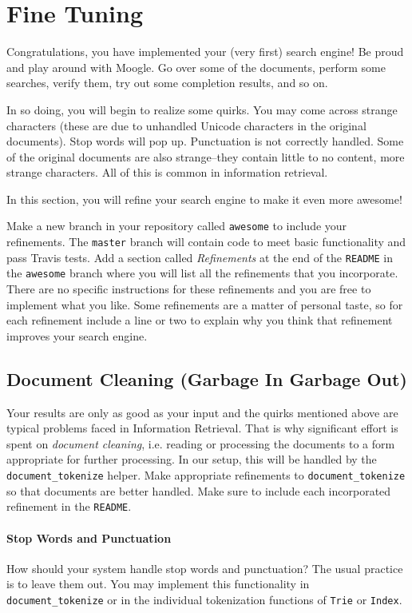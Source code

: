\documentclass[addpoints]{exam}
\begin{document}
\section{Fine Tuning}
\label{sec:refine}

Congratulations, you have implemented your (very first) search engine! Be proud and play around with Moogle. Go over some of the documents, perform some searches, verify them, try out some completion results, and so on.

In so doing, you will begin to realize some quirks. You may come across strange characters (these are due to unhandled Unicode characters in the original documents). Stop words will pop up. Punctuation is not correctly handled. Some of the original documents are also strange--they contain little to no content, more strange characters. All of this is common in information retrieval.

In this section, you will refine your search engine to make it even more awesome!

Make a new branch in your repository called \texttt{awesome} to include your refinements. The \texttt{master} branch will contain code to meet basic functionality and pass Travis tests. Add a section called \textit{Refinements} at the end of the \texttt{README} in the \texttt{awesome} branch where you will list all the refinements that you incorporate. There are no specific instructions for these refinements and you are free to implement what you like. Some refinements are a matter of personal taste, so for each refinement include a line or two to explain why you think that refinement improves your search engine.

\subsection{Document Cleaning (Garbage In Garbage Out)}

Your results are only as good as your input and the quirks mentioned above are typical problems faced in Information Retrieval. That is why significant effort is spent on \textit{document cleaning}, i.e. reading or processing the documents to a form appropriate for further processing. In our setup, this will be handled by the \texttt{document\_tokenize} helper. Make appropriate refinements to \texttt{document\_tokenize} so that documents are better handled. Make sure to include each incorporated refinement in the \texttt{README}. 

\paragraph{Stop Words and Punctuation} How should your system handle stop words and punctuation? The usual practice is to leave them out. You may implement this functionality in \texttt{document\_tokenize} or in the individual tokenization functions of \texttt{Trie} or \texttt{Index}.
\end{document}
